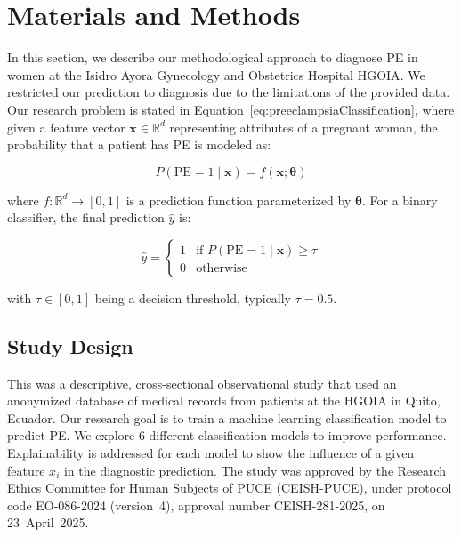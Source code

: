 \documentclass[diagnostics,article,submit,pdftex,moreauthors]{Definitions/mdpi}
\begin{document}


\section{Materials and Methods}
\label{sec:materials-methods}
In this section, we describe our methodological approach to diagnose
\ac{PE} in women at the Isidro Ayora Gynecology and Obstetrics
  Hospital \ac{HGOIA}. We restricted our
prediction to diagnosis due to the limitations of the provided
data. Our research problem is stated in
Equation~\eqref{eq:preeclampsiaClassification}, where given a feature vector
$\mathbf{x} \in \mathbb{R}^d$ representing  attributes of a
pregnant woman, the probability that a patient has \ac{PE} is modeled
as:

\begin{linenomath}
\begin{equation}
  \label{eq:preeclampsiaClassification}
  P(\mathrm{PE} = 1 \mid \mathbf{x}) = f(\mathbf{x}; \boldsymbol{\theta})
\end{equation}
\end{linenomath}

where $f: \mathbb{R}^d \to [0,1]$ is a prediction function
parameterized by $\boldsymbol{\theta}$. For a binary classifier, the
final prediction $\hat{y}$ is:

\begin{linenomath}
\begin{equation}
  \hat{y} =
  \begin{cases}
    1 & \text{if } P(\mathrm{PE} = 1 \mid \mathbf{x}) \geq \tau \\
    0 & \text{otherwise}
  \end{cases}
  \label{eq:preeclampsia_decision}
\end{equation}
\end{linenomath}

with $\tau \in [0,1]$ being a decision threshold, typically $\tau =
0.5$.

\subsection{Study Design}
\label{sec:study-design}
This was a descriptive, cross-sectional observational study that used
an anonymized database of medical records from
patients at the \ac{HGOIA} in Quito, Ecuador. Our research goal is to
train a machine learning classification model to predict \ac{PE}. We
explore 6 different classification models to improve
performance. Explainability is addressed for each model to show the
influence of a given feature $x_i$ in the diagnostic prediction.
The study was approved by the Research Ethics Committee for Human
Subjects of \ac{PUCE} (CEISH-\ac{PUCE}), under protocol code
EO-086-2024 (version~4), approval number CEISH-281-2025, on
23~April~2025.
\end{document}
